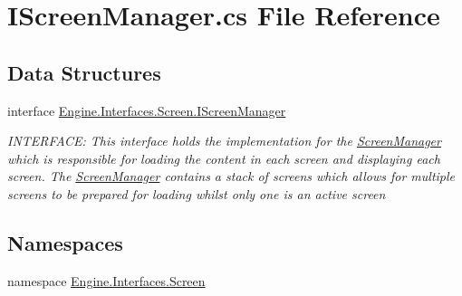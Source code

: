 \hypertarget{a00134}{}\section{I\+Screen\+Manager.\+cs File Reference}
\label{a00134}
\subsection*{Data Structures}
\begin{DoxyCompactItemize}
\item 
interface \hyperlink{a00470}{Engine.\+Interfaces.\+Screen.\+I\+Screen\+Manager}
\begin{DoxyCompactList}\small\item\em I\+N\+T\+E\+R\+F\+A\+CE\+: This interface holds the implementation for the \hyperlink{a00538}{Screen\+Manager} which is responsible for loading the content in each screen and displaying each screen. The \hyperlink{a00538}{Screen\+Manager} contains a stack of screens which allows for multiple screens to be prepared for loading whilst only one is an active screen \end{DoxyCompactList}\end{DoxyCompactItemize}
\subsection*{Namespaces}
\begin{DoxyCompactItemize}
\item 
namespace \hyperlink{a00263}{Engine.\+Interfaces.\+Screen}
\end{DoxyCompactItemize}

